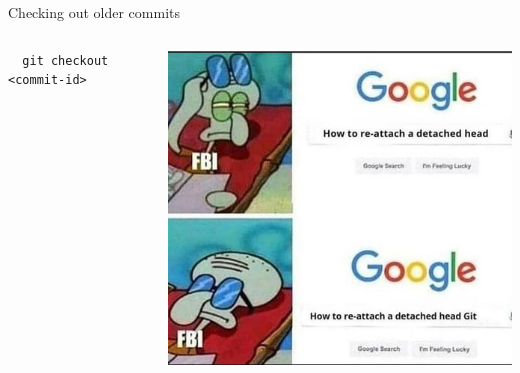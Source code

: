 \documentclass{beamer}
\begin{document}
\begin{frame}[fragile,t]{Checking out older commits}\vspace{10pt}
  \begin{columns}
    \begin{column}{0.5\textwidth}
      \begin{lstlisting}
  git checkout <commit-id>\end{lstlisting} 

      \end{column}
    \begin{column}{0.5\textwidth}
      \includegraphics[width=1\textwidth,height=0.5\textheight]{memes/detached_head.jpg}
    \end{column}
  \end{columns}
\end{frame}
\end{document}
